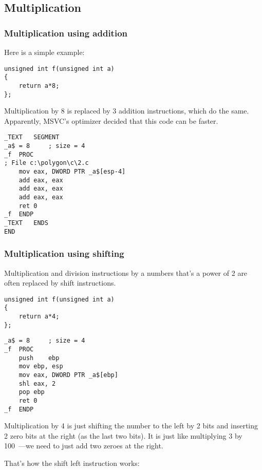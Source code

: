 ﻿\subsection{Multiplication}

\subsubsection{Multiplication using addition}

Here is a simple example:

\begin{lstlisting}[caption=\Optimizing MSVC 2010]
unsigned int f(unsigned int a)
{
	return a*8;
};
\end{lstlisting}

Multiplication by 8 is replaced by 3 addition instructions, which do the same.
Apparently, MSVC's optimizer decided that this code can be faster.

\begin{lstlisting}
_TEXT	SEGMENT
_a$ = 8		; size = 4
_f	PROC
; File c:\polygon\c\2.c
	mov	eax, DWORD PTR _a$[esp-4]
	add	eax, eax
	add	eax, eax
	add	eax, eax
	ret	0
_f	ENDP
_TEXT	ENDS
END
\end{lstlisting}

\subsubsection{Multiplication using shifting}
\label{subsec:mult_using_shifts}

Multiplication and division instructions by a numbers that's a power of 2 are often replaced by shift instructions.

\begin{lstlisting}
unsigned int f(unsigned int a)
{
	return a*4;
};
\end{lstlisting}

\begin{lstlisting}[caption=\NonOptimizing MSVC 2010]
_a$ = 8		; size = 4
_f	PROC
	push	ebp
	mov	ebp, esp
	mov	eax, DWORD PTR _a$[ebp]
	shl	eax, 2
	pop	ebp
	ret	0
_f	ENDP
\end{lstlisting}


Multiplication by 4 is just shifting the number to the left by 2 bits
and inserting 2 zero bits at the right (as the last two bits).
It is just like multiplying 3 by 100~---we need to just add two zeroes at the right.

That's how the shift left instruction works:



